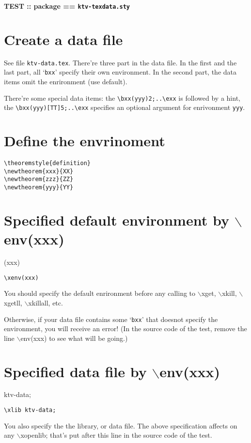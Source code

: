 \documentclass{article}
\def\back:{$\backslash$}
\begin{document}
\begin{center}
\Large\bf TEST :: package == {\tt ktv-texdata.sty}
\end{center}

\section{Create a data file}
See file {\tt ktv-data.tex}.
There're three part in the data file.
In the first and the last part, all `\verb~bxx~'
specify their own environment. In the second part,
the data items omit the enrironment (use default).

There're some special data items:
the \verb~\bxx(yyy)2;..\exx~ is followed by a hint,
the \verb~\bxx(yyy)[TT]5;..\exx~ specifies
an optional argument for enrivonment \verb~yyy~.

\section{Define the envrinoment}
\begin{verbatim}
\theoremstyle{definition}
\newtheorem{xxx}{XX}
\newtheorem{zzz}{ZZ}
\newtheorem{yyy}{YY}
\end{verbatim}
\theoremstyle{definition}
\newtheorem{xxx}{XX}
\newtheorem{zzz}{ZZ}
\newtheorem{yyy}{YY}

\section{Specified default environment by \back:env(xxx)}

\xenv(xxx)

\begin{verbatim}
\xenv(xxx)
\end{verbatim}
You should specify the default enrironment
before any calling to \back:xget, \back:xkill, \back:xgetll,
\back:xkillall, etc.

Otherwise, if your data file contains some `\verb|bxx|'
that doesnot specify the environment, you will receive an error!
(In the source code of the test, remove the line \back:env(xxx)
to see what will be going.)

\section{Specified data file by \back:env(xxx)}
\xlib ktv-data;

\begin{verbatim}
\xlib ktv-data;
\end{verbatim}
You also specify the the library, or data file.
The above specification affects on any \back:xopenlib;
that's put after this line in the source code of the test.
\end{document}
